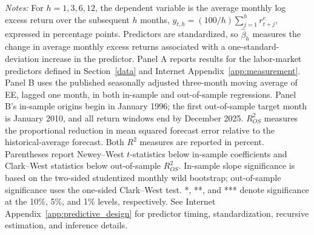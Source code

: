 \begin{table}[!htbp]
\begin{tabular}
\bottomrule\end{tabular}\par\vspace{7pt}\noindent\begin{minipage}[t]{\linewidth}\exhibitnotestyle\textit{Notes:} For $h=1,3,6,12$, the dependent variable is the average monthly log excess return over the subsequent $h$ months, $y_{t,h}=(100/h)\sum_{j=1}^{h}r^e_{t+j}$, expressed in percentage points. Predictors are standardized, so $\hat\beta_h$ measures the change in average monthly excess returns associated with a one-standard-deviation increase in the predictor. Panel A reports results for the labor-market predictors defined in Section~\ref{data} and Internet Appendix~\ref{app:measurement}. Panel B uses the published seasonally adjusted three-month moving average of EE, lagged one month, in both in-sample and out-of-sample regressions. Panel B's in-sample origins begin in January 1996; the first out-of-sample target month is January 2010, and all return windows end by December 2025. $R^2_{OS}$ measures the proportional reduction in mean squared forecast error relative to the historical-average forecast. Both $R^2$ measures are reported in percent. Parentheses report Newey--West $t$-statistics below in-sample coefficients and Clark--West statistics below out-of-sample $R^2_{OS}$. In-sample slope significance is based on the two-sided studentized monthly wild bootstrap; out-of-sample significance uses the one-sided Clark--West test. *, **, and *** denote significance at the 10\%, 5\%, and 1\% levels, respectively. See Internet Appendix~\ref{app:predictive_design} for predictor timing, standardization, recursive estimation, and inference details.\par\end{minipage}\end{table}
